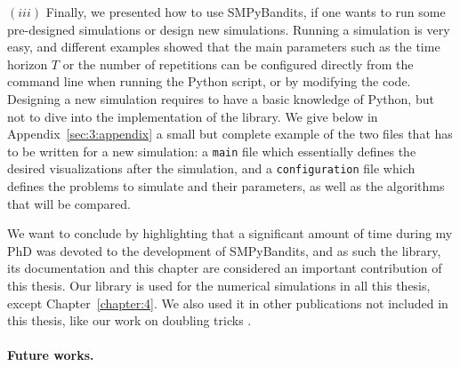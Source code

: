 $(iii)$
Finally, we presented how to use SMPyBandits, if one wants to run some pre-designed simulations or design new simulations.
Running a simulation is very easy, and different examples showed that the main parameters such as the time horizon $T$ or the number of repetitions can be configured directly from the command line when running the Python script, or by modifying the code.
Designing a new simulation requires to have a basic knowledge of Python, but not to dive into the implementation of the library.
We give below in Appendix~\ref{sec:3:appendix} a small but complete example of the two files that has to be written for a new simulation: a \texttt{main} file which essentially defines the desired visualizations after the simulation, and a \texttt{configuration} file which defines the problems to simulate and their parameters, as well as the algorithms that will be compared.


We want to conclude by highlighting that a significant amount of time during my PhD was devoted to the development of SMPyBandits, and as such the library, its documentation and this chapter  are considered an important contribution of this thesis.
%
Our library is used for the numerical simulations in all this thesis, except Chapter~\ref{chapter:4}.
We also used it in other publications not included in this thesis, like our work on doubling tricks \cite{Besson2018DoublingTricks}.


\paragraph{Future works.}
%

